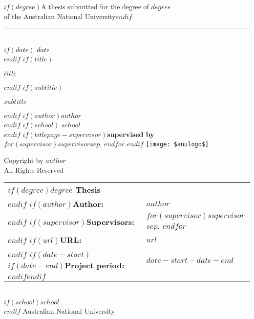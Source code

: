 
\begin{titlepage}
  \begin{flushright}%
    \vspace{40mm}
    $if(degree)${\small A thesis submitted for the degree of {\it $degree$} \\
    of the Australian National University}$endif$
    \rule[1ex]{\textwidth}{1pt}\\
    $if(date)${\fontsize{9}{0} $date$}\\$endif$
    \vspace{20mm}
    $if(title)${\fontsize{30}{32}\bfseries $title$\par}
      \vspace{12mm}$endif$
  $if(subtitle)$
	\parbox{\textwidth}{
	\begin{flushright}
		\fontsize{28}{30} $subtitle$
	\end{flushright}}
	$endif$
    \vfill
    $if(author)${\fontsize{20}{0}\bfseries $author$}\\
    \vspace{2mm}$endif$
    $if(school)${\fontsize{8}{0} $school$}\\
    \vspace{25mm}$endif$
    $if(titlepage-supervisor)${\fontsize{10}{0}\bfseries supervised by}\\
    $for(supervisor)$$supervisor$$sep$, $endfor$
    $endif$
    \vspace{2.0cm}
		\texttt{[image: \$anulogo\$]}\\
  		\vspace{8mm}
 \end{flushright}%
 
 \begin{center}
  \textcopyright Copyright by $author$\\
  All Rights Reserved
\end{center}

 \clearpage\thispagestyle{empty}
 \normalfont
 \vspace*{\fill}
 \noindent
 \begin{tabular}{lp{10cm}}
   $if(degree)${\bf $degree$ Thesis} & \\[2mm]$endif$
   $if(author)${\bf Author:} & $author$\\[2mm]$endif$
   $if(supervisor)${\bf Supervisors:} & $for(supervisor)$$supervisor$$sep$, $endfor$\\[2mm]$endif$
   $if(url)${\bf URL:} & $url$\\[2mm]$endif$
   $if(date-start)$$if(date-end)${\bf Project period:} & $date-start$ -- $date-end$ \\[2mm]$endif$$endif$
 \end{tabular}\\[2mm]

$if(school)$\noindent $school$\\$endif$
\noindent Australian National University

\end{titlepage}
\setlength{\parindent}{0pt}
\setlength{\parskip}{1ex plus 0.5ex minus 0.2ex}









